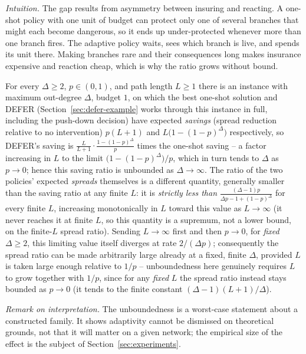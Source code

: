 \documentclass[ASNA,number]{USG}
\begin{document}
\emph{Intuition.} The gap results from asymmetry between insuring and
reacting. A one-shot policy with one unit of budget can protect only one of
several branches that might each become dangerous, so it ends up
under-protected whenever more than one branch fires. The adaptive policy waits,
sees which branch is live, and spends its unit there. Making branches rare
and their consequences long makes insurance expensive and reaction cheap,
which is why the ratio grows without bound.

\begin{theorem}\label{thm:adaptivity-gap}
For every $\Delta\ge 2$, $p\in(0,1)$, and path length $L\ge1$ there is an
instance with maximum out-degree $\Delta$, budget $1$, on which the best
one-shot solution and DEFER (Section~\ref{sec:defer-example} works through
this instance in full, including the push-down decision) have expected
\emph{savings} (spread reduction relative to no intervention) $p(L+1)$ and
$L\bigl(1-(1-p)^\Delta\bigr)$ respectively, so DEFER's saving
is $\frac{L}{L+1}\cdot\frac{1-(1-p)^\Delta}{p}$ times the one-shot saving --
a factor increasing in $L$ to the limit $\bigl(1-(1-p)^\Delta\bigr)/p$,
which in turn tends to $\Delta$ as $p\to0$; hence this saving ratio is
unbounded as $\Delta\to\infty$. The ratio of the two policies' expected
\emph{spreads} themselves is a different quantity, generally smaller than
the saving ratio at any finite $L$: it is \emph{strictly less than}
$\frac{(\Delta-1)p}{\Delta p-1+(1-p)^\Delta}$ for every finite $L$,
increasing monotonically in $L$ toward this value as $L\to\infty$ (it never
reaches it at finite $L$, so this quantity is a supremum, not a lower
bound, on the finite-$L$ spread ratio). Sending $L\to\infty$ first and then
$p\to0$, for \emph{fixed} $\Delta\ge2$, this limiting value itself diverges
at rate $2/(\Delta p)$; consequently the spread ratio can be made
arbitrarily large already at a fixed, finite $\Delta$, provided $L$ is
taken large enough relative to $1/p$ -- unboundedness here genuinely
requires $L$ to grow together with $1/p$, since for any \emph{fixed} $L$
the spread ratio instead stays bounded as $p\to0$ (it tends to the finite
constant $(\Delta-1)(L+1)/\Delta$).
\end{theorem}

\emph{Remark on interpretation.} The unboundedness is a worst-case
statement about a constructed family. It shows adaptivity cannot be dismissed
on theoretical grounds, not that it will matter on a given network; the
empirical size of the effect is the subject of Section~\ref{sec:experiments}.
\end{document}
